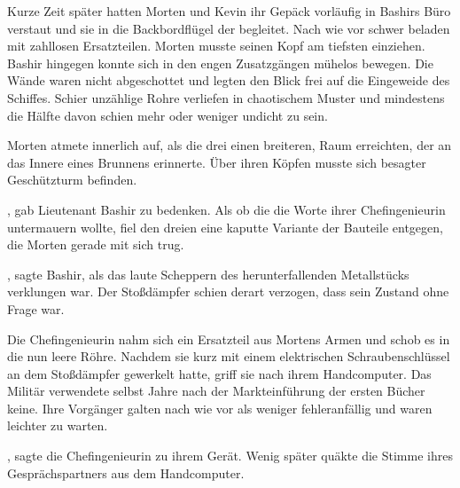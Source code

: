 Kurze Zeit später hatten Morten und Kevin ihr Gepäck vorläufig in Bashirs Büro verstaut und sie in die Backbordflügel der  begleitet. Nach wie vor schwer beladen mit zahllosen Ersatzteilen. Morten musste seinen Kopf am tiefsten einziehen. Bashir hingegen konnte sich in den engen Zusatzgängen mühelos bewegen. Die Wände waren nicht abgeschottet und legten den Blick frei auf die Eingeweide des Schiffes. Schier unzählige Rohre verliefen in chaotischem Muster und mindestens die Hälfte davon schien mehr oder weniger undicht zu sein.

\par

Morten atmete innerlich auf, als die drei einen breiteren, Raum erreichten, der an das Innere eines Brunnens erinnerte. Über ihren Köpfen musste sich besagter Geschützturm befinden.

\par

, gab Lieutenant Bashir zu bedenken.  Als ob die  die Worte ihrer Chefingenieurin untermauern wollte, fiel den dreien eine kaputte Variante der Bauteile entgegen, die Morten gerade mit sich trug.

\par

, sagte Bashir, als das laute Scheppern des herunterfallenden Metallstücks verklungen war. Der Stoßdämpfer schien derart verzogen, dass sein Zustand ohne Frage war.

\par

Die Chefingenieurin nahm sich ein Ersatzteil aus Mortens Armen und schob es in die nun leere Röhre. Nachdem sie kurz mit einem elektrischen Schraubenschlüssel an dem Stoßdämpfer gewerkelt hatte, griff sie nach ihrem Handcomputer. Das Militär verwendete selbst Jahre nach der Markteinführung der ersten Bücher keine. Ihre Vorgänger galten nach wie vor als weniger fehleranfällig und waren leichter zu warten.

\par

, sagte die Chefingenieurin zu ihrem Gerät. Wenig später quäkte die Stimme ihres Gesprächspartners aus dem Handcomputer. 

\par


